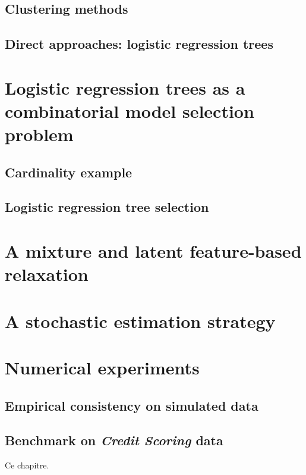 \subsection{Clustering methods}


\subsection{Direct approaches: logistic regression trees}



\section{Logistic regression trees as a combinatorial model selection problem}


\subsection{Cardinality example}


\subsection{Logistic regression tree selection}



\section{A mixture and latent feature-based relaxation}




\section{A stochastic estimation strategy}


\section{Numerical experiments}


\subsection{Empirical consistency on simulated data}

\subsection{Benchmark on \textit{Credit Scoring} data}




\bigskip

Ce chapitre.


\printbibliography[heading=subbibliography, title=References of Chapter 5]

